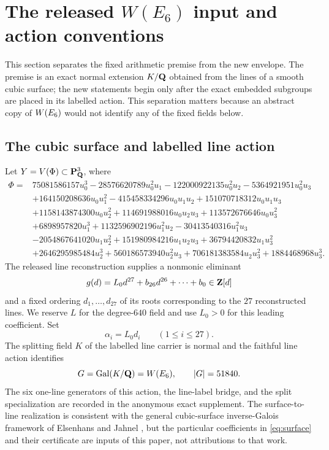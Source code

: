\section{The released \texorpdfstring{$W(E_6)$}{W(E6)} input and action conventions}
\label{sec:released-input}

This section separates the fixed arithmetic premise from the new envelope.
The premise is an exact normal extension $K/\mathbf{Q}$ obtained from the lines of a
smooth cubic surface; the new statements begin only after the exact embedded
subgroups are placed in its labelled action.  This separation matters because
an abstract copy of $W(E_6)$ would not identify any of the fixed fields below.

\subsection{The cubic surface and labelled line action}

Let $Y=V(\Phi)\subset\mathbf P^3_{\mathbf{Q}}$, where
\begin{equation}
\label{eq:surface}
\begin{aligned}
\Phi={}&75081586157u_0^3-28576620789u_0^2u_1-122000922135u_0^2u_2
-5364921951u_0^2u_3\\
&+164150208636u_0u_1^2-415458334296u_0u_1u_2
+151070718312u_0u_1u_3\\
&+1158143874300u_0u_2^2+114691988016u_0u_2u_3
+113572676646u_0u_3^2\\
&+6898957820u_1^3+1132596902196u_1^2u_2-30413540316u_1^2u_3\\
&-2054867641020u_1u_2^2+151980984216u_1u_2u_3
+36794420832u_1u_3^2\\
&+2646295985484u_2^3+560186573940u_2^2u_3
+706181383584u_2u_3^2+1884468968u_3^3.
\end{aligned}
\end{equation}
The released line reconstruction supplies a nonmonic eliminant
\[
 g(d)=L_0d^{27}+b_{26}d^{26}+\cdots+b_0\in\mathbf{Z}[d]
\]
and a fixed ordering $d_1,\ldots,d_{27}$ of its roots corresponding to the
$27$ reconstructed lines.  We reserve $L$ for the degree-$640$ field and use
$L_0>0$ for this leading coefficient.  Set
\begin{equation}
 \alpha_i=L_0d_i\qquad(1\le i\le27).
 \label{eq:scaled-roots}
\end{equation}
The splitting field $K$ of the labelled line carrier is normal and the
faithful line action identifies
\begin{equation}
 G=\operatorname{Gal}(K/\mathbf{Q})=W(E_6),\qquad |G|=51840.
 \label{eq:ambient-group}
\end{equation}
The six one-line generators of this action, the line-label bridge, and the
split specialization are recorded in the anonymous exact supplement.  The
surface-to-line realization is consistent with the general cubic-surface
inverse-Galois framework of Elsenhans and Jahnel
\citep{elsenhansjahnel2015moduli}, but the particular coefficients in
\eqref{eq:surface} and their certificate are inputs of this paper, not
attributions to that work.

